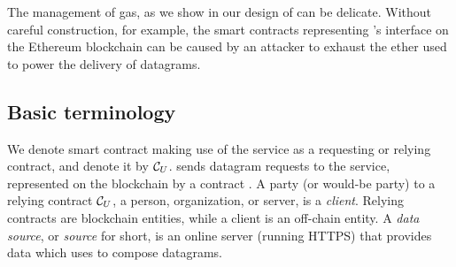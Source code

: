 The management of gas, as we show in our design of \tcs can be delicate. Without careful construction, for example, the smart contracts representing \tc's interface on the Ethereum blockchain can be caused by an attacker to exhaust the ether used to power the delivery of datagrams. 

\subsection{Basic terminology}
We denote smart contract making use of the \tcs service as a requesting or relying contract, and denote it by ${\cal C}_U$. \reqcont sends datagram requests to the \tc service, represented on the blockchain by a contract \tcont. A party (or would-be party) to a relying contract ${\cal C}_U$, a person, organization, or server, is a \emph{client}. Relying contracts are blockchain entities, while a client is an off-chain entity. A \emph{data source}, or \emph{source} for short, is an online server (running HTTPS) that provides data which \tc uses to compose datagrams.


